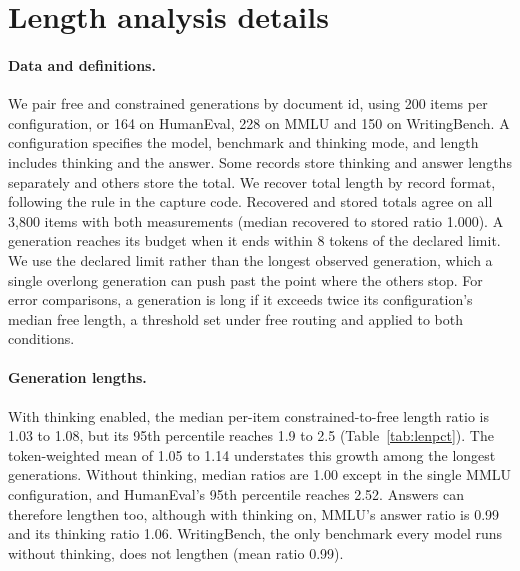 \section{Length analysis details}\label{app:length}

\paragraph{Data and definitions.} We pair free and constrained generations by document id, using 200 items per configuration, or 164 on HumanEval, 228 on MMLU and 150 on WritingBench. A configuration specifies the model, benchmark and thinking mode, and length includes thinking and the answer. Some records store thinking and answer lengths separately and others store the total. We recover total length by record format, following the rule in the capture code. Recovered and stored totals agree on all 3{,}800 items with both measurements (median recovered to stored ratio 1.000). A generation reaches its budget when it ends within 8 tokens of the declared limit. We use the declared limit rather than the longest observed generation, which a single overlong generation can push past the point where the others stop. For error comparisons, a generation is long if it exceeds twice its configuration's median free length, a threshold set under free routing and applied to both conditions.

\paragraph{Generation lengths.} With thinking enabled, the median per-item constrained-to-free length ratio is 1.03 to 1.08, but its 95th percentile reaches 1.9 to 2.5 (Table~\ref{tab:lenpct}). The token-weighted mean of 1.05 to 1.14 understates this growth among the longest generations. Without thinking, median ratios are 1.00 except in the single MMLU configuration, and HumanEval's 95th percentile reaches 2.52. Answers can therefore lengthen too, although with thinking on, MMLU's answer ratio is 0.99 and its thinking ratio 1.06. WritingBench, the only benchmark every model runs without thinking, does not lengthen (mean ratio 0.99).

